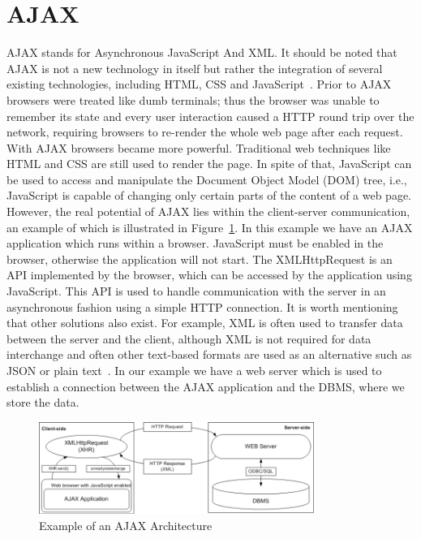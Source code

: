 \section{AJAX}
\label{sec:ajax}
AJAX stands for Asynchronous JavaScript And XML. It should be noted
that AJAX is not a new technology in itself but rather the integration of several 
existing technologies, including HTML, CSS and JavaScript~\cite{w3}. Prior to AJAX browsers 
were treated 
like dumb terminals; thus the browser was unable to remember its state and every 
user interaction caused a HTTP round trip over the network, requiring browsers 
to re-render the whole web page after each request. With AJAX browsers became 
more powerful. Traditional web techniques like HTML and CSS are still used to 
render the page. In spite of that, JavaScript can be used to access 
and manipulate the Document Object Model (DOM) tree, i.e., 
JavaScript is capable of changing only certain parts
of the content of a web page. However, the
real potential of AJAX lies within the client-server communication, an example
of which is illustrated in Figure~\ref{fig:ajax01}. In this example we have an AJAX application
which runs within a browser. JavaScript must be enabled in the browser, otherwise
the application will not start.  
The XMLHttpRequest is an API implemented by the browser,
which can be accessed by the application using JavaScript. This API is 
used to handle communication with the server in an asynchronous fashion using a
simple HTTP connection. It is worth mentioning that other solutions also exist. 
For example, XML is often used to transfer data between the server and the client, 
although XML is not required for data interchange and often other text-based
formats are used as an alternative such as JSON or plain text~\cite{bajax1}. In our example we have 
a web server which is used to establish a connection between the AJAX application and
the DBMS, where we store the data.

\begin{figure}[h]
	\begin{center}
		\includegraphics[width=0.8\textwidth]{./img/ajax01a.png}
		\caption{Example of an AJAX Architecture}
		\label{fig:ajax01}
	\end{center}
\end{figure}

